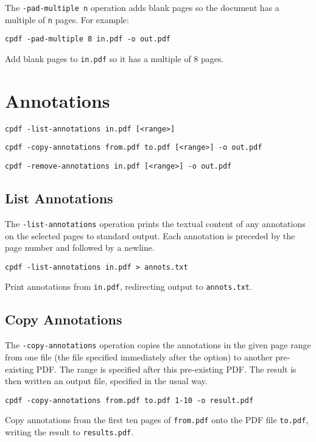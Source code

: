 \documentclass{book}
\begin{document}
  The \verb!-pad-multiple n! operation adds blank pages so the document has a multiple of \verb!n! pages. For example:
  \begin{framed}
    \small\verb!cpdf -pad-multiple 8 in.pdf -o out.pdf!
 
    \vspace{2.5mm}
    \noindent Add blank pages to \texttt{in.pdf} so it has a multiple of 8 pages. 
  \end{framed}
 
\chapter{Annotations}
  \begin{framed}
  \small\noindent\verb!cpdf -list-annotations in.pdf [<range>]!

  \vspace{1.5mm}
  \small\noindent\verb!cpdf -copy-annotations from.pdf to.pdf [<range>] -o out.pdf!

  \vspace{1.5mm}
  \small\noindent\verb!cpdf -remove-annotations in.pdf [<range>] -o out.pdf!
  \end{framed}

  \section{List Annotations}
  The \texttt{-list-annotations} operation prints the textual content of any
annotations on the selected pages to standard output. Each annotation is preceded by the page number and followed by a newline.
  \begin{framed}
    \small\verb!cpdf -list-annotations in.pdf > annots.txt!
    
    \vspace{2.5mm}
    \noindent Print annotations from \texttt{in.pdf}, redirecting output to \texttt{annots.txt}.
  \end{framed}

  \section{Copy Annotations}
  The \texttt{-copy-annotations} operation copies the annotations in the given
page range from one file (the file specified immediately after the option) to
another pre-existing PDF. The range is specified after this pre-existing PDF.
The result is then written an output file, specified in the usual way.
  \begin{framed}
    \small\verb!cpdf -copy-annotations from.pdf to.pdf 1-10 -o result.pdf !
    
    \vspace{2.5mm}
    \noindent Copy annotations from the first ten pages of \texttt{from.pdf}
onto the PDF file \texttt{to.pdf}, writing the result to \texttt{results.pdf}.

  \end{framed}
\end{document}
